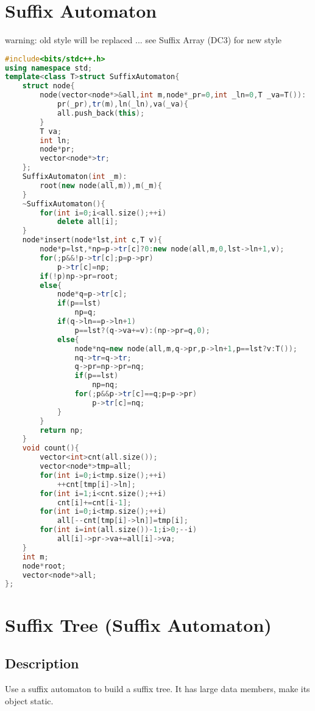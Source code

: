 \documentclass{book}
\begin{document}
\section{Suffix Automaton}
warning: old style will be replaced ... see Suffix Array (DC3) for new style\begin{lstlisting}[language=C++,title={Suffix Automaton.hpp (1694 bytes, 59 lines)}]
#include<bits/stdc++.h>
using namespace std;
template<class T>struct SuffixAutomaton{
    struct node{
        node(vector<node*>&all,int m,node*_pr=0,int _ln=0,T _va=T()):
            pr(_pr),tr(m),ln(_ln),va(_va){
            all.push_back(this);
        }
        T va;
        int ln;
        node*pr;
        vector<node*>tr;
    };
    SuffixAutomaton(int _m):
        root(new node(all,m)),m(_m){
    }
    ~SuffixAutomaton(){
        for(int i=0;i<all.size();++i)
            delete all[i];
    }
    node*insert(node*lst,int c,T v){
        node*p=lst,*np=p->tr[c]?0:new node(all,m,0,lst->ln+1,v);
        for(;p&&!p->tr[c];p=p->pr)
            p->tr[c]=np;
        if(!p)np->pr=root;
        else{
            node*q=p->tr[c];
            if(p==lst)
                np=q;
            if(q->ln==p->ln+1)
                p==lst?(q->va+=v):(np->pr=q,0);
            else{
                node*nq=new node(all,m,q->pr,p->ln+1,p==lst?v:T());
                nq->tr=q->tr;
                q->pr=np->pr=nq;
                if(p==lst)
                    np=nq;
                for(;p&&p->tr[c]==q;p=p->pr)
                    p->tr[c]=nq;
            }
        }
        return np;
    }
    void count(){
        vector<int>cnt(all.size());
        vector<node*>tmp=all;
        for(int i=0;i<tmp.size();++i)
            ++cnt[tmp[i]->ln];
        for(int i=1;i<cnt.size();++i)
            cnt[i]+=cnt[i-1];
        for(int i=0;i<tmp.size();++i)
            all[--cnt[tmp[i]->ln]]=tmp[i];
        for(int i=int(all.size())-1;i>0;--i)
            all[i]->pr->va+=all[i]->va;
    }
    int m;
    node*root;
    vector<node*>all;
};
\end{lstlisting}
\section{Suffix Tree (Suffix Automaton)}

\subsection*{Description}

Use a suffix automaton to build a suffix tree. It has large data members, make its object static.
\end{document}
